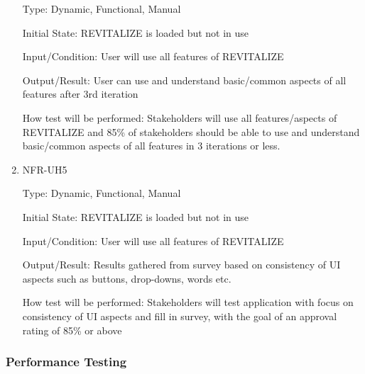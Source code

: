 \documentclass[12pt, titlepage]{article}
\begin{document}
\begin{enumerate}
	Type: Dynamic, Functional, Manual
	
	Initial State: REVITALIZE is loaded but not in use
	
	Input/Condition: User will use all features of REVITALIZE
	
	Output/Result: User can use and understand basic/common aspects of all features after 3rd iteration
	
	How test will be performed: Stakeholders will use all features/aspects of REVITALIZE and 85\% of stakeholders should be able to use and understand basic/common aspects of all features in 3 iterations or less.
	
	\item{NFR-UH5\\}
	
	Type: Dynamic, Functional, Manual
	
	Initial State: REVITALIZE is loaded but not in use
	
	Input/Condition: User will use all features of REVITALIZE
	
	Output/Result: Results gathered from survey based on consistency of UI aspects such as buttons, drop-downs, words etc.
	
	How test will be performed: Stakeholders will test application with focus on consistency of UI aspects and fill in survey, with the goal of an approval rating of 85\% or above
	
\end{enumerate}

\subsubsection{Performance Testing}
\end{document}
